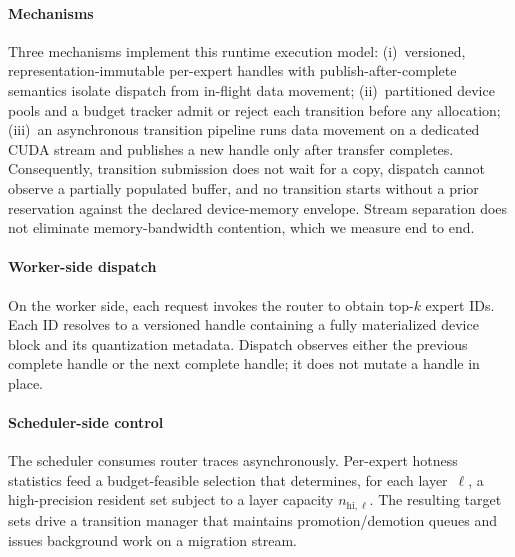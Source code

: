 \paragraph{Mechanisms}
Three mechanisms implement this runtime execution model:
(i)~versioned, representation-immutable per-expert handles with publish-after-complete semantics isolate dispatch from in-flight data movement;
(ii)~partitioned device pools and a budget tracker admit or reject each transition before any allocation;
(iii)~an asynchronous transition pipeline runs data movement on a dedicated CUDA stream and publishes a new handle only after transfer completes.
Consequently, transition submission does not wait for a copy, dispatch cannot observe a partially populated buffer, and no transition starts without a prior reservation against the declared device-memory envelope. Stream separation does not eliminate memory-bandwidth contention, which we measure end to end.

\paragraph{Worker-side dispatch}
On the worker side, each request invokes the router to obtain top-$k$ expert IDs. Each ID resolves to a versioned handle containing a fully materialized device block and its quantization metadata. Dispatch observes either the previous complete handle or the next complete handle; it does not mutate a handle in place.

\paragraph{Scheduler-side control}
The scheduler consumes router traces asynchronously. Per-expert hotness statistics feed a budget-feasible selection that determines, for each layer~$\ell$, a high-precision resident set subject to a layer capacity $n_{\mathrm{hi},\ell}$. The resulting target sets drive a transition manager that maintains promotion/demotion queues and issues background work on a migration stream.

